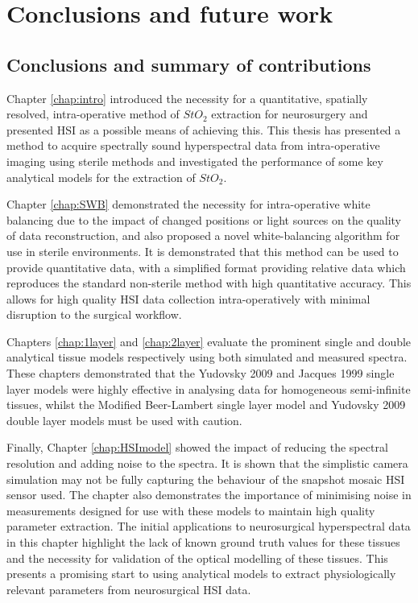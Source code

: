 \chapter{Conclusions and future work}
\label{chap:conclusion}
\minitoc
\section{Conclusions and summary of contributions}
Chapter \ref{chap:intro} introduced the necessity for a quantitative, spatially resolved, intra-operative method of $StO_2$ extraction for neurosurgery and presented HSI as a possible means of achieving this. This thesis has presented a method to acquire spectrally sound hyperspectral data from intra-operative imaging using sterile methods and investigated the performance of some key analytical models for the extraction of $StO_2$. 

Chapter \ref{chap:SWB} demonstrated the necessity for intra-operative white balancing due to the impact of changed positions or light sources on the quality of data reconstruction, and also proposed a novel white-balancing algorithm for use in sterile environments. It is demonstrated that this method can be used to provide quantitative data, with a simplified format providing relative data which reproduces the standard non-sterile method with high quantitative accuracy. This allows for high quality HSI data collection intra-operatively with minimal disruption to the surgical workflow. 

Chapters \ref{chap:1layer} and \ref{chap:2layer} evaluate the prominent single and double analytical tissue models respectively using both simulated and measured spectra. These chapters demonstrated that the Yudovsky 2009 and Jacques 1999 single layer models were highly effective in analysing data for homogeneous semi-infinite tissues, whilst the Modified Beer-Lambert single layer model and Yudovsky 2009 double layer models must be used with caution. 

Finally, Chapter \ref{chap:HSImodel} showed the impact of reducing the spectral resolution and adding noise to the spectra. It is shown that the simplistic camera simulation may not be fully capturing the behaviour of the snapshot mosaic HSI sensor used. The chapter also demonstrates the importance of minimising noise in measurements designed for use with these models to maintain high quality parameter extraction. The initial applications to neurosurgical hyperspectral data in this chapter highlight the lack of known ground truth values for these tissues and the necessity for validation of the optical modelling of these tissues. This presents a promising start to using analytical models to extract physiologically relevant parameters from neurosurgical HSI data. 

